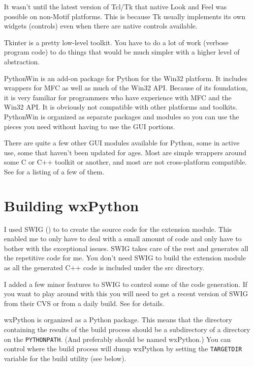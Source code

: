It wasn't until the latest version of Tcl/Tk that native Look and
Feel was possible on non-Motif platforms. This is because Tk
usually implements its own widgets (controls) even when there are
native controls available.

Tkinter is a pretty low-level toolkit. You have to do a lot of work
(verbose program code) to do things that would be much simpler with a higher
level of abstraction.


PythonWin is an add-on package for Python for the Win32 platform. It
includes wrappers for MFC as well as much of the Win32 API. Because
of its foundation, it is very familiar for programmers who have
experience with MFC and the Win32 API. It is obviously not compatible
with other platforms and toolkits. PythonWin is organized as separate
packages and modules so you can use the pieces you need without having
to use the GUI portions.


There are quite a few other GUI modules available for Python, some in
active use, some that haven't been updated for ages. Most are simple
wrappers around some C or C++ toolkit or another, and most are not
cross-platform compatible. See  
for a listing of a few of them.

\section{Building wxPython}\label{wxpbuild}

I used SWIG () to
to create the source code for the
extension module. This enabled me to only have to deal with a small
amount of code and only have to bother with the exceptional issues.
SWIG takes care of the rest and generates all the repetitive code for
me. You don't need SWIG to build the extension module as all the
generated C++ code is included under the src directory.

I added a few minor features to SWIG to control some of the code
generation. If you want to play around with this you will need to get
a recent version of SWIG from their CVS or from a daily build. See
 for details.

wxPython is organized as a Python package. This means that the
directory containing the results of the build process should be a
subdirectory of a directory on the {\tt PYTHONPATH}. (And preferably should
be named wxPython.) You can control where the build process will dump
wxPython by setting the {\tt TARGETDIR} variable for the build utility (see
below).

